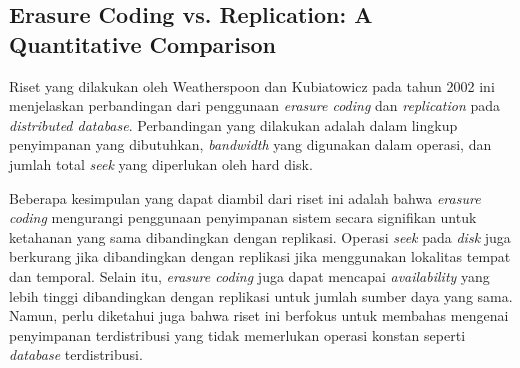 \subsection{Erasure Coding vs. Replication: A Quantitative Comparison}

Riset yang dilakukan oleh Weatherspoon dan Kubiatowicz pada tahun 2002 ini menjelaskan perbandingan dari penggunaan \textit{erasure coding} dan \textit{replication} pada \textit{distributed database}. Perbandingan yang dilakukan adalah dalam lingkup penyimpanan yang dibutuhkan, \textit{bandwidth} yang digunakan dalam operasi, dan jumlah total \textit{seek} yang diperlukan oleh hard disk.

Beberapa kesimpulan yang dapat diambil dari riset ini adalah bahwa \textit{erasure coding} mengurangi penggunaan penyimpanan sistem secara signifikan untuk ketahanan yang sama dibandingkan dengan replikasi. Operasi \textit{seek} pada \textit{disk} juga berkurang jika dibandingkan dengan replikasi jika menggunakan lokalitas tempat dan temporal. Selain itu, \textit{erasure coding} juga dapat mencapai \textit{availability} yang lebih tinggi dibandingkan dengan replikasi untuk jumlah sumber daya yang sama. Namun, perlu diketahui juga bahwa riset ini berfokus untuk membahas mengenai penyimpanan terdistribusi yang tidak memerlukan operasi konstan seperti \textit{database} terdistribusi.